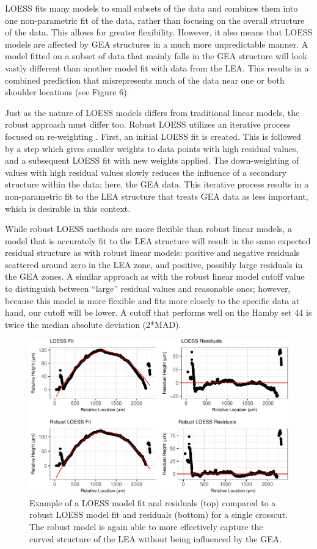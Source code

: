 \documentclass[]{article}
\begin{document}
LOESS fits many models to small subsets of the data and combines them
into one non-parametric fit of the data, rather than focusing on the
overall structure of the data. This allows for greater flexibility.
However, it also means that LOESS models are affected by GEA structures
in a much more unpredictable manner. A model fitted on a subset of data
that mainly falls in the GEA structure will look vastly different than
another model fit with data from the LEA. This results in a combined
prediction that misrepresents much of the data near one or both shoulder
locations (see Figure 6).

Just as the nature of LOESS models differs from traditional linear
models, the robust approach must differ too. Robust LOESS utilizes an
iterative process focused on re-weighting \citep[see][]{Cleveland1}.
First, an initial LOESS fit is created. This is followed by a step which
gives smaller weights to data points with high residual values, and a
subsequent LOESS fit with new weights applied. The down-weighting of
values with high residual values slowly reduces the influence of a
secondary structure within the data; here, the GEA data. This iterative
process results in a non-parametric fit to the LEA structure that treats
GEA data as less important, which is desirable in this context.

While robust LOESS methods are more flexible than robust linear models,
a model that is accurately fit to the LEA structure will result in the
same expected residual structure as with robust linear models: positive
and negative residuals scattered around zero in the LEA zone, and
positive, possibly large residuals in the GEA zones. A similar approach
as with the robust linear model cutoff value to distinguish between
``large'' residual values and reasonable ones; however, because this
model is more flexible and fits more closely to the specific data at
hand, our cutoff will be lower. A cutoff that performs well on the Hamby
set 44 is twice the median absolute deviation (2*MAD).

\begin{figure}
\centering
\includegraphics{writeup_files/figure-latex/unnamed-chunk-4-1.pdf}
\caption{Example of a LOESS model fit and residuals (top) compared to a
robust LOESS model fit and residuals (bottom) for a single crosscut. The
robust model is again able to more effectively capture the curved
structure of the LEA without being influenced by the GEA.}
\end{figure}
\end{document}
